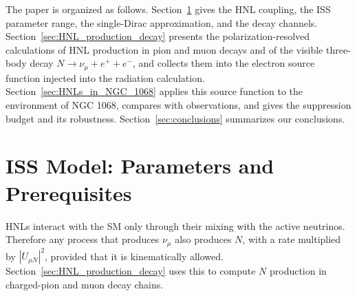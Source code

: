 \documentclass{ws-ijmpa}
\begin{document}
The paper is organized as follows. Section~\ref{sec:iss_model} gives the HNL
coupling, the ISS parameter range, the single-Dirac approximation, and the
decay channels. Section~\ref{sec:HNL_production_decay} presents the
polarization-resolved calculations of HNL production in pion and muon decays
and of the visible three-body decay $N \to \nu_\mu + e^+ + e^-$, and
collects them into the electron source function injected into the radiation
calculation. Section~\ref{sec:HNLs_in_NGC_1068} applies this source function
to the environment of NGC 1068, compares with observations, and gives the
suppression budget and its robustness. Section~\ref{sec:conclusions}
summarizes our conclusions.

\section{ISS Model: Parameters and Prerequisites}\label{sec:iss_model}


HNLs interact with the SM only through their mixing with the active
neutrinos. Therefore any process that produces $\nu_\mu$ also produces $N$,
with a rate multiplied by $|U_{\mu N}|^2$, provided that it is
kinematically allowed. Section~\ref{sec:HNL_production_decay}
uses this to compute $N$ production in charged-pion and muon decay chains.
\end{document}
